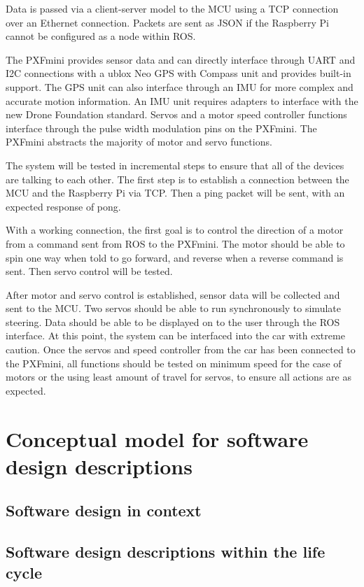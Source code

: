 \documentclass[compsoc,draftclsnofoot,onecolumn,10pt]{IEEEtran}
\begin{document}
Data is passed via a client-server model to the MCU using a TCP connection over an Ethernet connection. Packets are sent as JSON if the Raspberry Pi cannot be configured as a node within ROS. \par

The PXFmini provides sensor data and can directly interface through UART and I2C connections with a ublox Neo GPS with Compass unit and provides built-in support. The GPS unit can also interface through an IMU for more complex and accurate motion information. An IMU unit requires adapters to interface with the new Drone Foundation standard. 
Servos and a motor speed controller functions interface through the pulse width modulation pins on the PXFmini. The PXFmini abstracts the majority of motor and servo functions. \par

The system will be tested in incremental steps to ensure that all of the devices are talking to each other. 
The first step is to establish a connection between the MCU and the Raspberry Pi via TCP. Then a ping packet will be sent, with an expected response of pong. \par
With a working connection, the first goal is to control the direction of a motor from a command sent from ROS to the PXFmini. The motor should be able to spin one way when told to go forward, and reverse when a  reverse command is sent. Then servo control will be tested. \par
After motor and servo control is established, sensor data will be collected and sent to the MCU. Two servos should be able to run synchronously to simulate steering. Data should be able to be displayed on to the user through the ROS interface. 
At this point, the system can be interfaced into the car with extreme caution. Once the servos and speed controller from the car has been connected to the PXFmini, all functions should be tested on minimum speed for the case of motors or the using least amount of travel for servos, to ensure all actions are as expected. \par

\section{Conceptual model for software design descriptions} 
\subsection{Software design in context}
\subsection{Software design descriptions within the life cycle}
\end{document}
